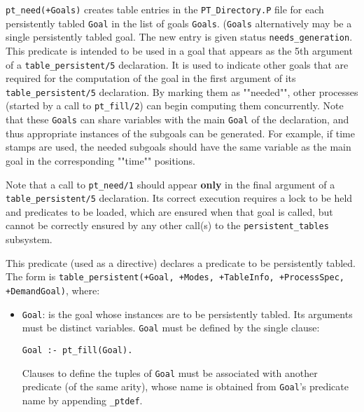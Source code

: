 \begin{description}
%
{\tt pt\_need(+Goals)} creates table entries in
the {\tt PT\_Directory.P} file for each persistently tabled {\tt Goal}
in the list of goals {\tt Goals}.  ({\tt Goals} alternatively may be a
single persistently tabled goal.  The new entry is given status
{\tt needs\_generation}.  This predicate is intended to be used in a
goal that appears as the 5th argument of a {\tt table\_persistent/5}
declaration.  It is used to indicate other goals that are required for
the computation of the goal in the first argument of its
{\tt table\_persistent/5} declaration.  By marking them as ""needed"",
other processes (started by a call to {\tt pt\_fill/2}) can begin
computing them concurrently.  Note that these {\tt Goals} can share
variables with the main {\tt Goal} of the declaration, and thus
appropriate instances of the subgoals can be generated.  For example,
if time stamps are used, the needed subgoals should have the same
variable as the main goal in the corresponding ""time"" positions.

Note that a call to {\tt pt\_need/1} should appear {\bf only} in the
final argument of a {\tt table\_persistent/5} declaration.  Its correct
execution requires a lock to be held and predicates to be loaded,
which are ensured when that goal is called, but cannot be correctly
ensured by any other call(s) to the {\tt persistent\_tables} subsystem.

%
This predicate (used as a directive)
declares a predicate to be persistently tabled.  The form is
{\tt table\_persistent(+Goal, +Modes, +TableInfo, +ProcessSpec,
+DemandGoal)}, where:

\begin{itemize}

\item{{\tt Goal}}: is the goal whose instances are to be persistently
tabled.  Its arguments must be distinct variables.
{\tt Goal} must be defined by the single clause:

\begin{verbatim}
Goal :- pt_fill(Goal).
\end{verbatim}

Clauses to define the tuples of {\tt Goal} must be associated with
another predicate (of the same arity), whose name is obtained from
{\tt Goal}'s predicate name by appending {\tt \_ptdef}.


\end{itemize}
\end{description}

